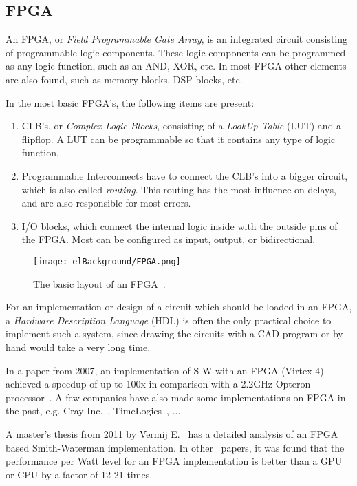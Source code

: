 \subsection{FPGA}

An FPGA, or \emph{Field Programmable Gate Array}, is an integrated circuit consisting of programmable logic components. These logic components can be programmed as any logic function, such as an AND, XOR, etc. In most FPGA other elements are also found, such as memory blocks, DSP blocks, etc.

In the most basic FPGA's, the following items are present:
\begin{enumerate}
	\item CLB's, or \emph{Complex Logic Blocks}, consisting of a \emph{LookUp Table} (LUT) and a flipflop. A LUT can be programmable so that it contains any type of logic function.
	\item Programmable Interconnects have to connect the CLB's into a bigger circuit, which is also called \emph{routing}. This routing has the most influence on delays, and are also responsible for most errors.
	\item I/O blocks, which connect the internal logic inside with the outside pins of the FPGA. Most can be configured as input, output, or bidirectional.
\end{enumerate}

\begin{figure}[H]
	\centering
	\texttt{[image: elBackground/FPGA.png]}
	\caption{The basic layout of an FPGA~\cite{fpgaworkings}.}
	\label{fig:fpga}
\end{figure}

For an implementation or design of a circuit which should be loaded in an FPGA, a \emph{Hardware Description Language} (HDL) is often the only practical choice to implement such a system, since drawing the circuits with a CAD program or by hand would take a very long time.

In a paper from 2007, an implementation of S-W with an FPGA (Virtex-4) achieved a speedup of up to 100x in comparison with a 2.2GHz Opteron processor~\cite{fpga100x}.%
A few companies have also made some implementations on FPGA in the past, e.g. Cray Inc.~\cite{3}, TimeLogics~\cite{4}, ...

A master's thesis from 2011 by Vermij E.~\cite{Vermij} %
 has a detailed analysis of an FPGA based Smith-Waterman implementation. In other~\cite{FPGAeff} papers, it was found that the performance per Watt level for an FPGA implementation is better than a GPU or CPU by a factor of 12-21 times.

